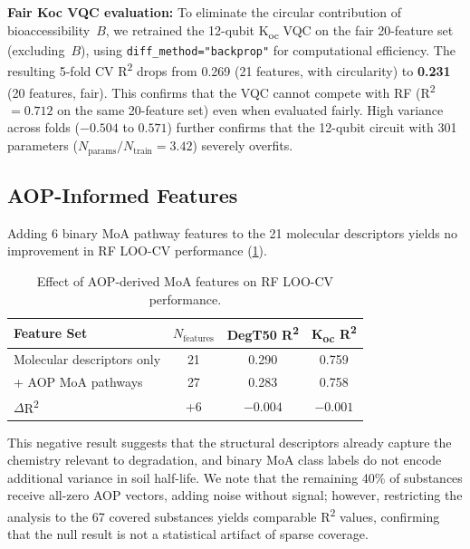 \documentclass[12pt,a4paper]{article}
\newcommand{\degtl}{DegT50}
\newcommand{\koc}{K\textsubscript{oc}}
\newcommand{\rtwo}{R\textsuperscript{2}}
\newcommand{\loocv}{LOO-CV}
\newcommand{\nfeat}{21}
\begin{document}
\textbf{Fair Koc VQC evaluation:} To eliminate the circular contribution
of bioaccessibility~$B$, we retrained the 12-qubit \koc{} VQC on the fair
20-feature set (excluding~$B$), using \texttt{diff\_method="backprop"}
for computational efficiency. The resulting 5-fold CV \rtwo{} drops from
0.269 (21 features, with circularity) to \textbf{0.231} (20 features,
fair). This confirms that the VQC cannot compete with RF
(\rtwo{}~$= 0.712$ on the same 20-feature set) even when evaluated fairly.
High variance across folds ($-0.504$ to $0.571$) further confirms that
the 12-qubit circuit with 301 parameters
($N_\text{params}/N_\text{train} = 3.42$) severely overfits.


\subsection{AOP-Informed Features}
\label{sec:results_aop}

Adding 6 binary MoA pathway features to the \nfeat{} molecular descriptors
yields no improvement in RF \loocv{} performance (\cref{tab:aop}).

\begin{table}[htbp]
  \centering
  \caption{Effect of AOP-derived MoA features on RF \loocv{} performance.}
  \label{tab:aop}
  \small
  \begin{tabular}{lccc}
    \toprule
    \textbf{Feature Set} & \textbf{$N_\text{features}$} &
      \textbf{\degtl{} \rtwo{}} & \textbf{\koc{} \rtwo{}} \\
    \midrule
    Molecular descriptors only     & 21 & 0.290 & 0.759 \\
    + AOP MoA pathways             & 27 & 0.283 & 0.758 \\
    \midrule
    $\Delta$\rtwo{}                & +6 & $-0.004$ & $-0.001$ \\
    \bottomrule
  \end{tabular}
\end{table}

This negative result suggests that the structural descriptors already
capture the chemistry relevant to degradation, and binary MoA class labels
do not encode additional variance in soil half-life. We note that the
remaining 40\% of substances receive all-zero AOP vectors, adding noise
without signal; however, restricting the analysis to the 67 covered
substances yields comparable \rtwo{} values, confirming that the null
result is not a statistical artifact of sparse coverage.
\end{document}
